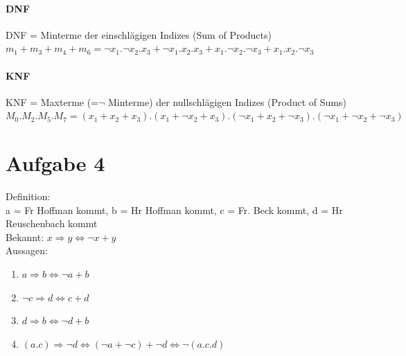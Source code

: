 \documentclass[10pt,a4paper]{scrartcl}
\begin{document}
\paragraph{DNF}
DNF = Minterme der einschlägigen Indizes (Sum of Products)\\
$m_1 + m_3 + m_4 + m_6 = \neg x_1.\neg x_2.x_3 + \neg x_1.x_2.x_3 + x_1.\neg x_2.\neg x_3 + x_1.x_2.\neg x_3$

\paragraph{KNF}
KNF = Maxterme (=$\neg$ Minterme) der nullschlägigen Indizes (Product of Sums)\\
$M_0 . M_2 . M_5 . M_7  = (x_1+x_2+x_3) . (x_1+\neg x_2+x_3) . (\neg x_1+x_2+\neg x_3) . (\neg x_1+\neg x_2+\neg x_3)$


\section{Aufgabe 4}
Definition: \\
a = Fr Hoffman kommt, b = Hr Hoffman kommt, c = Fr. Beck kommt, d = Hr Reuschenbach kommt\\
Bekannt: $x \Rightarrow y \Longleftrightarrow \neg x + y$\\
Aussagen: 
\begin{enumerate}
 \item $a \Rightarrow b \Longleftrightarrow \neg a + b$ 
 \item $\neg c \Rightarrow d \Longleftrightarrow c + d$
 \item $d \Rightarrow b \Longleftrightarrow \neg d + b$
 \item $(a.c) \Rightarrow \neg d \Longleftrightarrow (\neg a+\neg c) + \neg d \Longleftrightarrow \neg (a.c.d)$
\end{enumerate}
\end{document}
